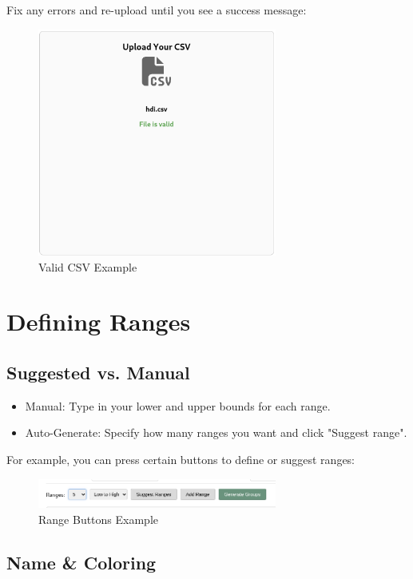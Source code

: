 \documentclass{article}
\begin{document}
Fix any errors and re-upload until you see a success message:

\begin{figure}[h!]
  \centering
  \includegraphics[width=0.7\textwidth]{valid.png}
  \caption{Valid CSV Example}
\end{figure}


\section{Defining Ranges}

\subsection{Suggested vs. Manual}

\begin{itemize}
  \item Manual: Type in your lower and upper bounds for each range.
  \item Auto-Generate: Specify how many ranges you want and click
    "Suggest range".
\end{itemize}

\noindent
For example, you can press certain buttons to define or suggest ranges:

\begin{figure}[h!]
  \centering
  \includegraphics[width=0.7\textwidth]{range_buttons.png}
  \caption{Range Buttons Example}
\end{figure}

\subsection{Name \& Coloring}
\end{document}
